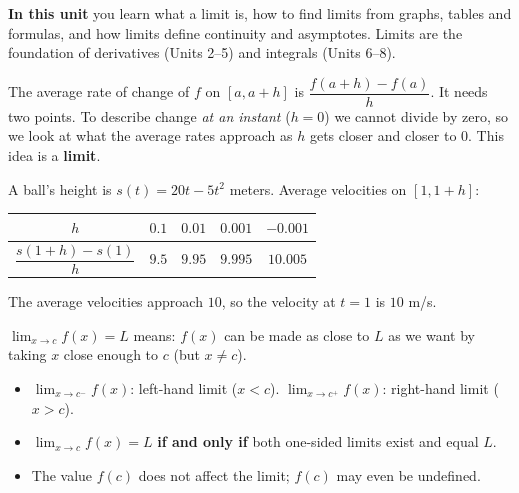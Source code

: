 \documentclass[11pt]{article}
\begin{document}

\textbf{In this unit} you learn what a limit is, how to find limits from graphs, tables and formulas, and how limits define continuity and asymptotes. Limits are the foundation of derivatives (Units 2--5) and integrals (Units 6--8).

The average rate of change of $f$ on $[a,a+h]$ is $\dfrac{f(a+h)-f(a)}{h}$. It needs two points. To describe change \emph{at an instant} ($h=0$) we cannot divide by zero, so we look at what the average rates approach as $h$ gets closer and closer to 0. This idea is a \textbf{limit}.

\begin{example}
A ball's height is $s(t)=20t-5t^2$ meters. Average velocities on $[1,1+h]$:
\begin{center}\begin{tabular}{c|cccc}
$h$ & $0.1$ & $0.01$ & $0.001$ & $-0.001$\\\hline
$\dfrac{s(1+h)-s(1)}{h}$ & $9.5$ & $9.95$ & $9.995$ & $10.005$
\end{tabular}\end{center}
\sol The average velocities approach $10$, so the velocity at $t=1$ is $10$ m/s.
\end{example}

\begin{keyidea}
$\displaystyle\lim_{x\to c}f(x)=L$ means: $f(x)$ can be made as close to $L$ as we want by taking $x$ close enough to $c$ (but $x\neq c$).
\begin{itemize}
\item $\displaystyle\lim_{x\to c^-}f(x)$: left-hand limit ($x<c$). $\displaystyle\lim_{x\to c^+}f(x)$: right-hand limit ($x>c$).
\item $\displaystyle\lim_{x\to c}f(x)=L$ \textbf{if and only if} both one-sided limits exist and equal $L$.
\item The value $f(c)$ does not affect the limit; $f(c)$ may even be undefined.
\end{itemize}
\end{keyidea}
\end{document}
